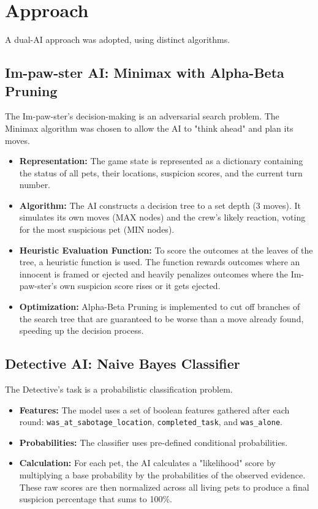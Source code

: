 \documentclass{article}
\begin{document}
\section{Approach}
A dual-AI approach was adopted, using distinct algorithms.

\subsection{Im-paw-ster AI: Minimax with Alpha-Beta Pruning}
The Im-paw-ster's decision-making is an adversarial search problem. The Minimax algorithm was chosen to allow the AI to "think ahead" and plan its moves.

\begin{itemize}
    \item \textbf{Representation:} The game state is represented as a dictionary containing the status of all pets, their locations, suspicion scores, and the current turn number.
    \item \textbf{Algorithm:} The AI constructs a decision tree to a set depth (3 moves). It simulates its own moves (MAX nodes) and the crew's likely reaction, voting for the most suspicious pet (MIN nodes).
    \item \textbf{Heuristic Evaluation Function:} To score the outcomes at the leaves of the tree, a heuristic function is used. The function rewards outcomes where an innocent is framed or ejected and heavily penalizes outcomes where the Im-paw-ster's own suspicion score rises or it gets ejected.
    \item \textbf{Optimization:} Alpha-Beta Pruning is implemented to cut off branches of the search tree that are guaranteed to be worse than a move already found, speeding up the decision process.
\end{itemize}

\subsection{Detective AI: Naive Bayes Classifier}
The Detective's task is a probabilistic classification problem.

\begin{itemize}
    \item \textbf{Features:} The model uses a set of boolean features gathered after each round: \texttt{was\_at\_sabotage\_location}, \texttt{completed\_task}, and \texttt{was\_alone}.
    \item \textbf{Probabilities:} The classifier uses pre-defined conditional probabilities.
    \item \textbf{Calculation:} For each pet, the AI calculates a "likelihood" score by multiplying a base probability by the probabilities of the observed evidence. These raw scores are then normalized across all living pets to produce a final suspicion percentage that sums to 100\%.
\end{itemize}
\end{document}
